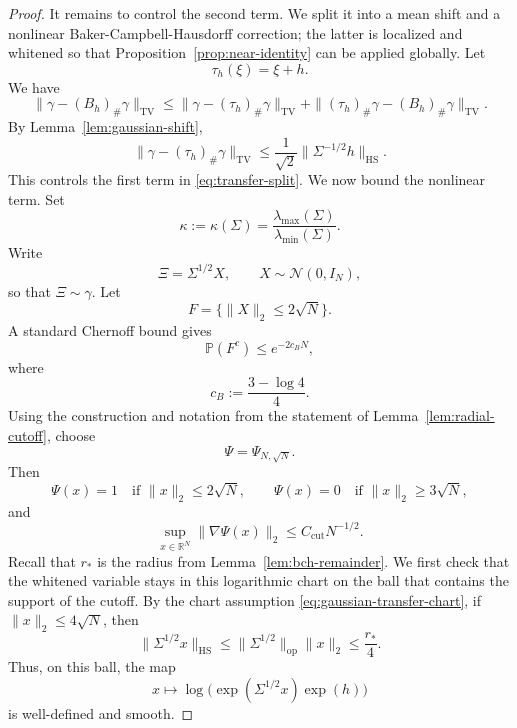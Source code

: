 \documentclass[11pt, reqno]{amsart}
\numberwithin{equation}{section}
\theoremstyle{remark}
\newcommand{\R}{\mathbb{R}}
\newcommand{\Prob}{\mathbb{P}}
\newcommand{\1}{\mathbf{1}}
\newcommand{\HS}{\mathrm{HS}}
\newcommand{\op}{\mathrm{op}}
\newcommand{\TV}{\mathrm{TV}}
\begin{document}
\begin{proof}
It remains to control the second term. We split it into a mean shift and a nonlinear Baker-Campbell-Hausdorff correction; the latter is localized and whitened so that Proposition~\ref{prop:near-identity} can be applied globally. Let
\[
\tau_h(\xi)=\xi+h.
\]
We have
\begin{equation}
\label{eq:transfer-split}
\|\gamma-(B_h)_\#\gamma\|_{\TV}
\le
\|\gamma-(\tau_h)_\#\gamma\|_{\TV}
+
\|(\tau_h)_\#\gamma-(B_h)_\#\gamma\|_{\TV}.
\end{equation}
By Lemma~\ref{lem:gaussian-shift},
\begin{equation}
\label{eq:transfer-gaussian-shift}
\|\gamma-(\tau_h)_\#\gamma\|_{\TV}
\le
\frac1{\sqrt2}\|\Sigma^{-1/2}h\|_{\HS}.
\end{equation}
This controls the first term in \eqref{eq:transfer-split}. We now bound the nonlinear term. Set
\[
\kappa:=\kappa(\Sigma)
=
\frac{\lambda_{\max}(\Sigma)}{\lambda_{\min}(\Sigma)}.
\]
Write
\[
\Xi=\Sigma^{1/2}X,
\qquad
X\sim\mathcal N(0,I_N),
\]
so that \(\Xi\sim\gamma\). Let
\[
F=\{\|X\|_2\le 2\sqrt N\}.
\]
A standard Chernoff bound gives
\begin{equation}
\label{eq:transfer-X-tail}
\Prob(F^c)\le e^{-2c_BN},
\end{equation}
where
\[
c_B:=\frac{3-\log 4}{4}.
\]
Using the construction and notation from the statement of Lemma~\ref{lem:radial-cutoff}, choose
\[
\Psi=\Psi_{N,\sqrt N}.
\]
Then
\[
\Psi(x)=1 \quad\text{if }\|x\|_2\le 2\sqrt N,
\qquad
\Psi(x)=0 \quad\text{if }\|x\|_2\ge 3\sqrt N,
\]
and
\begin{equation}
\label{eq:transfer-cutoff-grad}
\sup_{x\in\R^N}\|\nabla\Psi(x)\|_2
\le
C_{\mathrm{cut}}N^{-1/2}.
\end{equation}
Recall that $r_\ast$ is the radius from Lemma~\ref{lem:bch-remainder}. We first check that the whitened variable stays in this logarithmic chart on the ball that contains the support of the cutoff.
By the chart assumption \eqref{eq:gaussian-transfer-chart}, if
\(\|x\|_2\le 4\sqrt N\), then
\[
\|\Sigma^{1/2}x\|_{\HS}
\le
\|\Sigma^{1/2}\|_{\op}\|x\|_2
\le
\frac{r_\ast}{4}.
\]
Thus, on this ball, the map
\[
x\mapsto \log\!\bigl(\exp(\Sigma^{1/2}x)\exp(h)\bigr)
\]
is well-defined and smooth.


\end{proof}
\end{document}
